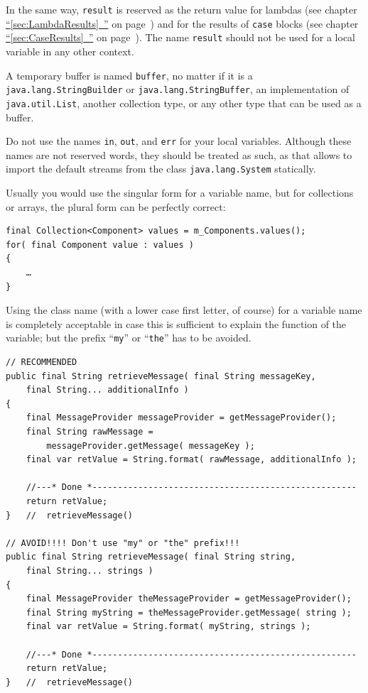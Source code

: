 \documentclass[11pt,a4paper, titlepage, parskip=half, headsepline, footsepline, cleardoublepage=current, headheight=1cm]{scrbook}
\newcommand*{\tqfullvref}[1]{\hyperref[{#1}]{“\ref*{#1}~\nameref*{#1}”} on page~\pageref{#1}}
\begin{document}
In the same way, \lstinline|result| is reserved as the return value for lambdas (see chapter \tqfullvref{sec:LambdaResults}) and for the results of \lstinline|case| blocks (see chapter \tqfullvref{sec:CaseResults}). The name \lstinline|result| should not be used for a local variable in any other context.

A temporary buffer is named \lstinline|buffer|, no matter if it is a \lstinline|java.lang.StringBuilder| or \lstinline|java.lang.StringBuffer|, an implementation of \lstinline|java.util.List|, another collection type, or any other type that can be used as a buffer.

Do not use the names \lstinline|in|, \lstinline|out|, and \lstinline|err| for your local variables. Although these names are not reserved words, they should be treated as such, as that allows to import the default streams from the class \lstinline|java.lang.System|\autocite{ORACLE_DOC_SYSTEM_CLASS} statically.

Usually you would use the singular form for a variable name, but for collections or arrays, the plural form can be perfectly correct:
\begin{lstlisting}
final Collection<Component> values = m_Components.values();
for( final Component value : values )
{
    …
}    
\end{lstlisting}

Using the class name (with a lower case first letter, of course) for a variable name is completely acceptable in case this is sufficient to explain the function of the variable; but the prefix “\verb#my#” or “\verb#the#” has to be avoided.
\begin{lstlisting}
// RECOMMENDED
public final String retrieveMessage( final String messageKey, 
    final String... additionalInfo )
{
    final MessageProvider messageProvider = getMessageProvider();
    final String rawMessage = 
        messageProvider.getMessage( messageKey );
    final var retValue = String.format( rawMessage, additionalInfo );
    
    //---* Done *----------------------------------------------------
    return retValue;
}   //  retrieveMessage()

// AVOID!!!! Don't use "my" or "the" prefix!!!
public final String retrieveMessage( final String string, 
    final String... strings )
{
    final MessageProvider theMessageProvider = getMessageProvider();
    final String myString = theMessageProvider.getMessage( string );
    final var retValue = String.format( myString, strings );
    
    //---* Done *----------------------------------------------------
    return retValue;
}   //  retrieveMessage()
\end{lstlisting}
\end{document}
